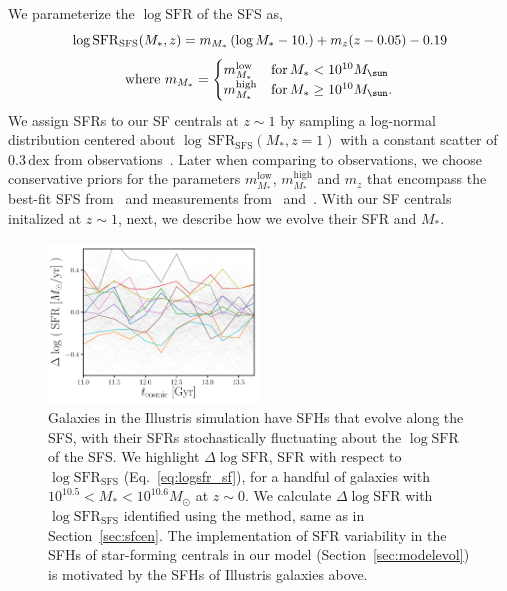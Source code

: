 \documentclass[12pt, letterpaper, preprint, tighten]{aastex62}
\newcommand{\beq}{\begin{equation}}
\newcommand{\eeq}{\end{equation}}
\newcommand{\logsfr}{\log\mathrm{SFR}}
\newcommand{\logsfrsfs}{\log\mathrm{SFR}_\mathrm{SFS}}
\begin{document}
We parameterize the $\log\mathrm{SFR}$ of the SFS as, 
\beq \label{eq:logsfr_ms}
\logsfr_{\rm SFS}(M_*, z) =  m_{M_*}\,(\log M_* - 10.) + m_z (z - 0.05) - 0.19
\eeq
\begin{equation*}
{\rm where}~m_{M_*} = \begin{cases}
m^\mathrm{low}_{M_*} & \text{for}\,M_* < 10^{10}M_\sun \\
m^\mathrm{high}_{M_*} & \text{for}\,M_* \geq 10^{10}M_\sun.
\end{cases}
\end{equation*}
We assign SFRs to our SF centrals at $z\sim1$ by sampling a log-normal 
distribution centered about $\log\,\mathrm{SFR}_\mathrm{SFS}(M_*, z=1)$ 
with a constant scatter of $0.3\,\mathrm{dex}$ from observations~\citep{daddi2007, noeske2007, magdis2012, whitaker2012}.
Later when comparing to observations, we choose conservative priors 
for the parameters $m^\mathrm{low}_{M_*}$, $m^\mathrm{high}_{M_*}$ and $m_z$
that encompass the best-fit SFS from~\cite{speagle2014} and measurements 
from~\cite{moustakas2013} and~\cite{lee2015}. With our SF centrals initalized 
at $z \sim 1$, next, we describe how we evolve their SFR and $M_*$.

\begin{figure}
\begin{center}
\includegraphics[width=0.5\textwidth]{figs/illustris_sfh.pdf} 
    \caption{Galaxies in the Illustris simulation have SFHs that evolve along the
    SFS, with their SFRs stochastically fluctuating about the $\logsfr$ of the SFS.
    We highlight $\Delta \logsfr$, SFR with respect to $\logsfrsfs$ (Eq.~\ref{eq:logsfr_sf}), 
    for a handful of galaxies with $10^{10.5}< M_* < 10^{10.6}M_\odot$ at $z\sim0$. 
    We calculate $\Delta \logsfr$ with $\logsfrsfs$ identified using the \cite{hahn2018a} 
    method, same as in Section~\ref{sec:sfcen}. The implementation of $\mathrm{SFR}$ 
    variability in the SFHs of star-forming centrals in our model (Section~\ref{sec:modelevol}) 
    is motivated by the SFHs of Illustris galaxies above.
    }
\label{fig:illsfh}
\end{center}
\end{figure}
\end{document}
